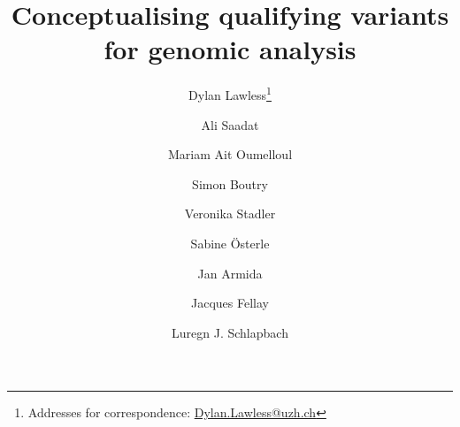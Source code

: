 
\usepackage[printonlyused,withpage,nohyperlinks]{acronym}
% 


\newcommand{\boxlabel}[1]{%
  \refstepcounter{myboxcounter}%
  \label{#1}%
}


\title{Conceptualising qualifying variants for genomic analysis}


\author[1]{Dylan Lawless\thanks{Addresses for correspondence: \href{mailto:Dylan.Lawless@uzh.ch}{Dylan.Lawless@uzh.ch}}}
\author[2]{Ali Saadat}
\author[2]{Mariam Ait Oumelloul}
\author[2]{Simon Boutry}
\author[1]{Veronika Stadler}
\author[3]{Sabine Österle}
\author[3]{Jan Armida}
\author[2]{Jacques Fellay}
\author[1]{Luregn J. Schlapbach}

\maketitle
\justify

\clearpage

